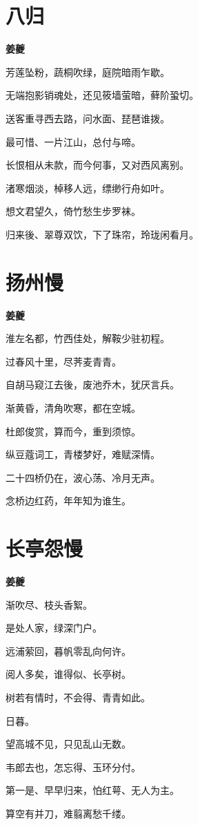 \documentclass[12pt,a4paper]{ctexbook}
\begin{document}
\section{八归}
\textbf{姜夔}\par\vspace{0.5em}
芳莲坠粉，蔬桐吹绿，庭院暗雨乍歇。\par
无端抱影销魂处，还见筱墙萤暗，藓阶蛩切。\par
送客重寻西去路，问水面、琵琶谁拨。\par
最可惜、一片江山，总付与啼。\par
长恨相从未款，而今何事，又对西风离别。\par
渚寒烟淡，棹移人远，缥缈行舟如叶。\par
想文君望久，倚竹愁生步罗袜。\par
归来後、翠尊双饮，下了珠帘，玲珑闲看月。\par

\section{扬州慢}
\textbf{姜夔}\par\vspace{0.5em}
淮左名都，竹西佳处，解鞍少驻初程。\par
过春风十里，尽荠麦青青。\par
自胡马窥江去後，废池乔木，犹厌言兵。\par
渐黄昏，清角吹寒，都在空城。\par
杜郎俊赏，算而今，重到须惊。\par
纵豆蔻词工，青楼梦好，难赋深情。\par
二十四桥仍在，波心荡、冷月无声。\par
念桥边红药，年年知为谁生。\par

\section{长亭怨慢}
\textbf{姜夔}\par\vspace{0.5em}
渐吹尽、枝头香絮。\par
是处人家，绿深门户。\par
远浦萦回，暮帆零乱向何许。\par
阅人多矣，谁得似、长亭树。\par
树若有情时，不会得、青青如此。\par
日暮。\par
望高城不见，只见乱山无数。\par
韦郎去也，怎忘得、玉环分付。\par
第一是、早早归来，怕红萼、无人为主。\par
算空有并刀，难翦离愁千缕。\par
\end{document}
